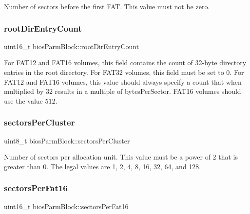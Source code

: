 Number of sectors before the first F\+AT. This value must not be zero. \mbox{\label{structbios_parm_block_a9a1b24bb2dbb3a123c4ffc703954d71d}} 
\subsubsection{\texorpdfstring{root\+Dir\+Entry\+Count}{rootDirEntryCount}}
{\footnotesize\ttfamily uint16\+\_\+t bios\+Parm\+Block\+::root\+Dir\+Entry\+Count}

For F\+A\+T12 and F\+A\+T16 volumes, this field contains the count of 32-\/byte directory entries in the root directory. For F\+A\+T32 volumes, this field must be set to 0. For F\+A\+T12 and F\+A\+T16 volumes, this value should always specify a count that when multiplied by 32 results in a multiple of bytes\+Per\+Sector. F\+A\+T16 volumes should use the value 512. \mbox{\label{structbios_parm_block_a45d5e2d8c93a028a074e8ce3dc751ab5}} 
\subsubsection{\texorpdfstring{sectors\+Per\+Cluster}{sectorsPerCluster}}
{\footnotesize\ttfamily uint8\+\_\+t bios\+Parm\+Block\+::sectors\+Per\+Cluster}

Number of sectors per allocation unit. This value must be a power of 2 that is greater than 0. The legal values are 1, 2, 4, 8, 16, 32, 64, and 128. \mbox{\label{structbios_parm_block_a24d6e5a9069491d5db6dbe747336985b}} 
\subsubsection{\texorpdfstring{sectors\+Per\+Fat16}{sectorsPerFat16}}
{\footnotesize\ttfamily uint16\+\_\+t bios\+Parm\+Block\+::sectors\+Per\+Fat16}


